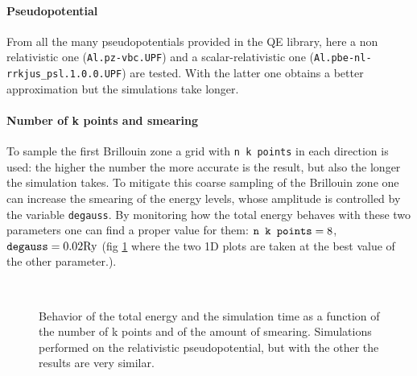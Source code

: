 \documentclass[a4paper, 11pt]{article}
\begin{document}
    \paragraph{Pseudopotential}
      From all the many pseudopotentials provided in the QE library, here a non relativistic one (\verb|Al.pz-vbc.UPF|) and a scalar-relativistic one (\verb|Al.pbe-nl-rrkjus_psl.1.0.0.UPF|) are tested.
      With the latter one obtains a better approximation but the simulations take longer.
    \paragraph{Number of k points and smearing}
      To sample the first Brillouin zone a grid with \verb|n k points| in each direction is used: the higher the number the more accurate is the result, but also the longer the simulation takes. To mitigate this coarse sampling of the Brillouin zone one can increase the smearing of the energy levels, whose amplitude is controlled by the variable \verb|degauss|. By monitoring how the total energy behaves with these two parameters one can find a proper value for them: $\verb|n k points| = 8$, $ \verb|degauss| = 0.02 \si{.Ry}$ (fig \ref{fig:bulk_degauss-n_k} where the two 1D plots are taken at the best value of the other parameter.).

    \begin{figure}
      \centering
       \\
      \caption{Behavior of the total energy and the simulation time as a function of the number of k points and of the amount of smearing. Simulations performed on the relativistic pseudopotential, but with the other the results are very similar.}
      \label{fig:bulk_degauss-n_k}
    \end{figure}

\end{document}
